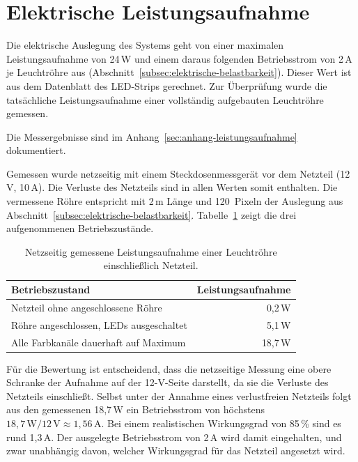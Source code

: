 \section{Elektrische Leistungsaufnahme}
\label{sec:leistungsaufnahme}

Die elektrische Auslegung des Systems geht von einer maximalen Leistungsaufnahme
von 24\,W und einem daraus folgenden Betriebsstrom von 2\,A je Leuchtröhre aus
(Abschnitt~\ref{subsec:elektrische-belastbarkeit}). Dieser Wert ist aus dem
Datenblatt des LED-Strips gerechnet. Zur Überprüfung wurde die tatsächliche
Leistungsaufnahme einer vollständig aufgebauten Leuchtröhre gemessen.

Die Messergebnisse sind im Anhang~\ref{sec:anhang-leistungsaufnahme} dokumentiert.

Gemessen wurde netzseitig mit einem Steckdosenmessgerät vor dem Netzteil
(12\,V, 10\,A). Die Verluste des Netzteils sind in allen Werten somit enthalten.
Die vermessene Röhre entspricht mit 2\,m Länge und 120~Pixeln der Auslegung aus
Abschnitt~\ref{subsec:elektrische-belastbarkeit}. Tabelle~\ref{tab:leistung}
zeigt die drei aufgenommenen Betriebszustände.

\begin{table}[htbp]
  \centering
  \small
  \begin{tabular}{lr}
    \toprule
    Betriebszustand & Leistungsaufnahme \\
    \midrule
    Netzteil ohne angeschlossene Röhre & 0,2\,W \\
    Röhre angeschlossen, LEDs ausgeschaltet & 5,1\,W \\
    Alle Farbkanäle dauerhaft auf Maximum & 18,7\,W \\
    \bottomrule
  \end{tabular}
  \caption{Netzseitig gemessene Leistungsaufnahme einer Leuchtröhre einschließlich
    Netzteil.}
  \label{tab:leistung}
\end{table}

Für die Bewertung ist entscheidend, dass die netzseitige Messung eine obere
Schranke der Aufnahme auf der 12-V-Seite darstellt, da sie die Verluste des
Netzteils einschließt. Selbst unter der Annahme eines verlustfreien Netzteils
folgt aus den gemessenen 18,7\,W ein Betriebsstrom von höchstens
$18{,}7\,\text{W} / 12\,\text{V} \approx 1{,}56\,\text{A}$. Bei einem
realistischen Wirkungsgrad von 85\,\% sind es rund 1,3\,A. Der ausgelegte
Betriebsstrom von 2\,A wird damit eingehalten, und zwar unabhängig davon, welcher
Wirkungsgrad für das Netzteil angesetzt wird.

